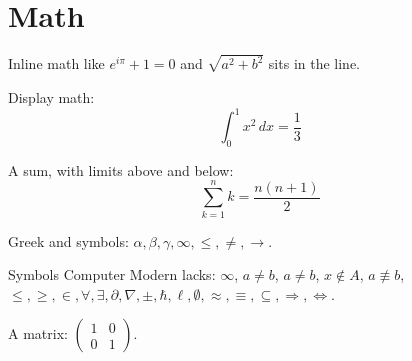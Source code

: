 \section{Math}

Inline math like $e^{i\pi} + 1 = 0$ and $\sqrt{a^2 + b^2}$ sits in the line.

Display math:
\[
  \int_0^1 x^2 \, dx = \frac{1}{3}
\]

A sum, with limits above and below:
\[
  \sum_{k=1}^{n} k = \frac{n(n+1)}{2}
\]

Greek and symbols: $\alpha, \beta, \gamma, \infty, \leq, \neq, \rightarrow$.

Symbols Computer Modern lacks: $\infty$, $a \neq b$, $a \ne b$, $x \notin A$, $a \not\equiv b$,
$\leq, \geq, \in, \forall, \exists, \partial, \nabla, \pm, \hbar, \ell, \emptyset, \approx, \equiv, \subseteq, \Rightarrow, \iff$.

A matrix: $\left( \begin{array}{cc} 1 & 0 \\ 0 & 1 \end{array} \right)$.
